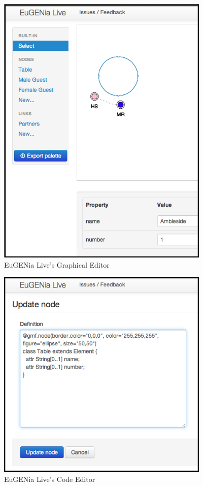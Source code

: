 \begin{figure}[h]
\begin{center}
	\includegraphics[width=4in]{figures/eugenia_live_graphical.png}
\end{center}
\caption{EuGENia Live's Graphical Editor \citep{eugeniaLiveDocumentation}}
\label{eugeniaLiveGraphcal}
\end{figure}

\begin{figure}[h]
\begin{center}
	\includegraphics[width=4in]{figures/eugenia_live_code.png}
\end{center}
\caption{EuGENia Live's Code Editor \citep{eugeniaLiveDocumentation}}
\label{eugeniaLiveCode}
\end{figure}


